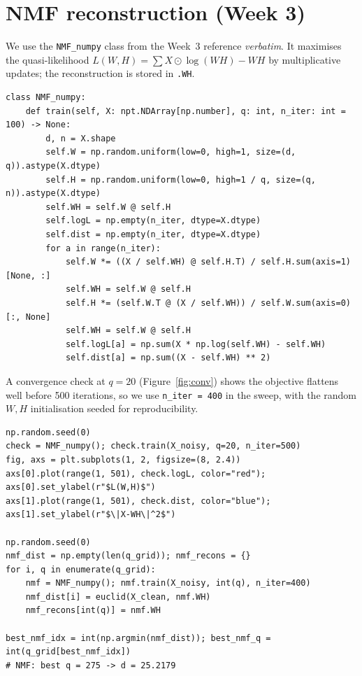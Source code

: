 \documentclass[10pt,a4paper]{article}
\begin{document}
\section{NMF reconstruction (Week 3)}

We use the \texttt{NMF\_numpy} class from the Week~3 reference \emph{verbatim}. It maximises the quasi-likelihood $L(W,H)=\sum X\odot\log(WH)-WH$ by multiplicative updates; the reconstruction is stored in \texttt{.WH}.

\begin{lstlisting}
class NMF_numpy:
    def train(self, X: npt.NDArray[np.number], q: int, n_iter: int = 100) -> None:
        d, n = X.shape
        self.W = np.random.uniform(low=0, high=1, size=(d, q)).astype(X.dtype)
        self.H = np.random.uniform(low=0, high=1 / q, size=(q, n)).astype(X.dtype)
        self.WH = self.W @ self.H
        self.logL = np.empty(n_iter, dtype=X.dtype)
        self.dist = np.empty(n_iter, dtype=X.dtype)
        for a in range(n_iter):
            self.W *= ((X / self.WH) @ self.H.T) / self.H.sum(axis=1)[None, :]
            self.WH = self.W @ self.H
            self.H *= (self.W.T @ (X / self.WH)) / self.W.sum(axis=0)[:, None]
            self.WH = self.W @ self.H
            self.logL[a] = np.sum(X * np.log(self.WH) - self.WH)
            self.dist[a] = np.sum((X - self.WH) ** 2)
\end{lstlisting}

A convergence check at $q=20$ (Figure~\ref{fig:conv}) shows the objective flattens well before 500 iterations, so we use \texttt{n\_iter\,=\,400} in the sweep, with the random $W,H$ initialisation seeded for reproducibility.

\begin{lstlisting}
np.random.seed(0)
check = NMF_numpy(); check.train(X_noisy, q=20, n_iter=500)
fig, axs = plt.subplots(1, 2, figsize=(8, 2.4))
axs[0].plot(range(1, 501), check.logL, color="red");  axs[0].set_ylabel(r"$L(W,H)$")
axs[1].plot(range(1, 501), check.dist, color="blue"); axs[1].set_ylabel(r"$\|X-WH\|^2$")

np.random.seed(0)
nmf_dist = np.empty(len(q_grid)); nmf_recons = {}
for i, q in enumerate(q_grid):
    nmf = NMF_numpy(); nmf.train(X_noisy, int(q), n_iter=400)
    nmf_dist[i] = euclid(X_clean, nmf.WH)
    nmf_recons[int(q)] = nmf.WH

best_nmf_idx = int(np.argmin(nmf_dist)); best_nmf_q = int(q_grid[best_nmf_idx])
# NMF: best q = 275 -> d = 25.2179
\end{lstlisting}
\end{document}
